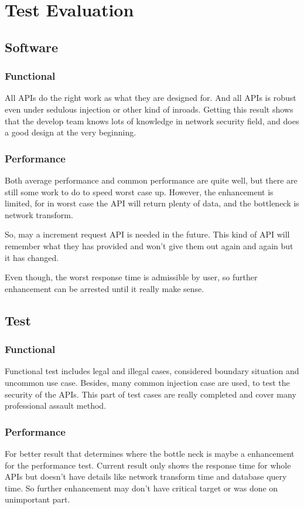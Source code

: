 \section{Test Evaluation}
\label{sec:test_evaluation}
  \subsection{Software}
    \subsubsection{Functional}
      All APIs do the right work as what they are designed for.
      And all APIs is robust even under sedulous injection or other kind of inroads.
      Getting this result shows that the develop team knows lots of knowledge in network security field, and does a good design at the very beginning.
    \subsubsection{Performance}
      Both average performance and common performance are quite well, but there are still some work to do to speed worst case up.
      However, the enhancement is limited, for in worst case the API will return plenty of data, and the bottleneck is network transform.

      So, may a increment request API is needed in the future.
      This kind of API will remember what they has provided and won't give them out again and again but it has changed.

      Even though, the worst response time is admissible by user, so further enhancement can be arrested until it really make sense.
  \subsection{Test}
    \subsubsection{Functional}
      Functional test includes legal and illegal cases, considered boundary situation and uncommon use case.
      Besides, many common injection case are used, to test the security of the APIs.
      This part of test cases are really completed and cover many professional assault method.
    \subsubsection{Performance}
      For better result that determines where the bottle neck is maybe a enhancement for the performance test.
      Current result only shows the response time for whole APIs but doesn't have details like network transform time and database query time.
      So further enhancement may don't have critical target or was done on unimportant part.

